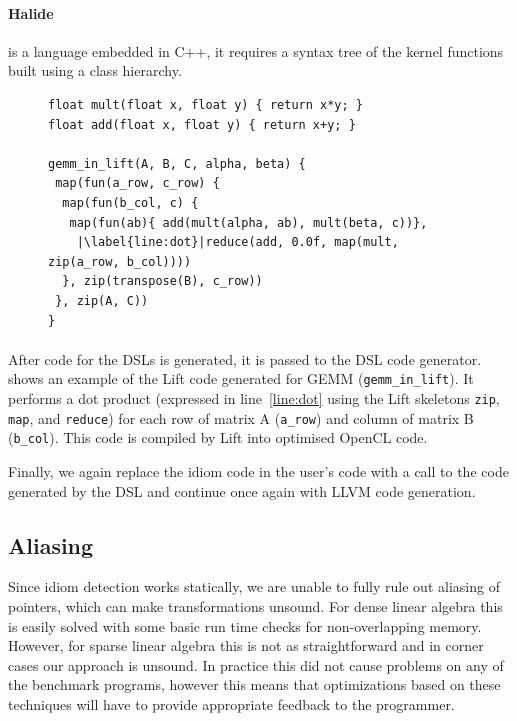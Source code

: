 \paragraph{Halide} is a language embedded in C++, it requires a syntax tree of the kernel functions built using a class hierarchy.

\begin{figure}[ht]
\begin{lstlisting}[language={},escapechar=|,
                   label={fig:liftmxm},caption=
   {Example of matrix multiplication in Lift}]
float mult(float x, float y) { return x*y; }
float add(float x, float y) { return x+y; }

gemm_in_lift(A, B, C, alpha, beta) {
 map(fun(a_row, c_row) {
  map(fun(b_col, c) {
   map(fun(ab){ add(mult(alpha, ab), mult(beta, c))},
    |\label{line:dot}|reduce(add, 0.0f, map(mult, zip(a_row, b_col))))
  }, zip(transpose(B), c_row))
 }, zip(A, C))
}
\end{lstlisting}
\end{figure}

\paragraph{}
After code for the DSLs is generated, it is passed to the DSL code generator.
 shows an example of the Lift code generated for GEMM (\texttt{gemm\_in\_lift}).
It performs a dot product (expressed in line~\ref{line:dot} using the Lift skeletons \texttt{zip}, \texttt{map}, and \texttt{reduce}) for each row of matrix A (\texttt{a\_row}) and column of matrix B (\texttt{b\_col}).
This code is compiled by Lift into optimised OpenCL code.

Finally, we again replace the idiom code in the user's code with a call to the code generated by the DSL and continue once again with LLVM code generation.

\subsection{Aliasing}

    Since idiom detection works statically, we are unable to fully rule out
    aliasing of pointers, which can make transformations unsound.
    For dense linear algebra this is easily solved with some basic run time
    checks for non-overlapping memory.
    However, for sparse linear algebra this is not as straightforward and in
    corner cases our approach is unsound.
    In practice this did not cause problems on any of the benchmark programs,
    however this means that optimizations based on these techniques will have to
    provide appropriate feedback to the programmer.

